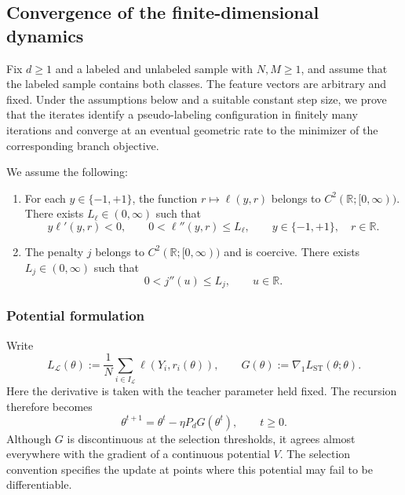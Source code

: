 \subsection{Convergence of the finite-dimensional dynamics}
\label{subsec:finite-dim}

Fix $d\geq1$ and a labeled and unlabeled sample with
$N,M\geq1$, and assume that the labeled sample contains
both classes. The feature vectors are arbitrary and fixed.
Under the assumptions below and a suitable constant step size,
we prove that the iterates identify a pseudo-labeling
configuration in finitely many iterations and converge
at an eventual geometric rate to the minimizer of the
corresponding branch objective.

\begin{assumption}
\label{assumption:finite-dim-loss-penalty}
We assume the following:
\begin{enumerate}
    \item For each $y\in\{-1,+1\}$, the function
    $r\mapsto\ell(y,r)$ belongs to
    $C^2(\mathbb R;[0,\infty))$. There exists
    $L_\ell\in(0,\infty)$ such that
    \[
        y\ell'(y,r)<0,
        \qquad
        0<\ell''(y,r)\leq L_\ell,
        \qquad
        y\in\{-1,+1\},\quad r\in\mathbb R.
    \]

    \item The penalty $j$ belongs to
    $C^2(\mathbb R;[0,\infty))$ and is coercive.
    There exists $L_j\in(0,\infty)$ such that
    \[
        0<j''(u)\leq L_j,
        \qquad u\in\mathbb R.
    \]
\end{enumerate}
\end{assumption}

\subsubsection{Potential formulation}

Write
\[
    L_{\mathcal L}(\theta)
    :=
    \frac1N\sum_{i\in I_{\mathcal L}}
        \ell(Y_i,r_i(\theta)),
    \qquad
    G(\theta)
    :=
    \nabla_1L_{\mathrm{ST}}(\theta;\theta).
\]
Here the derivative is taken with the teacher parameter held fixed.
The recursion therefore becomes
\begin{equation}
    \theta^{t+1}
    =
    \theta^t-\eta P_dG(\theta^t),
    \qquad t\geq0.
    \label{eq:ST-recursion-G}
\end{equation}
Although $G$ is discontinuous at the selection thresholds,
it agrees almost everywhere with the gradient of a continuous
potential $V$. The selection convention specifies the update
at points where this potential may fail to be differentiable.


